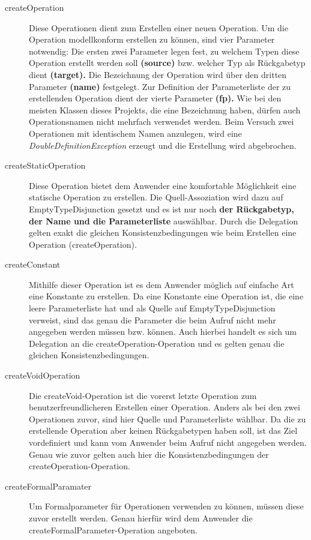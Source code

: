 \begin{description}
\item[createOperation]
Diese Operationen dient zum Erstellen einer neuen Operation. Um die Operation modellkonform erstellen zu können, sind vier Parameter notwendig:
Die ersten zwei Parameter legen fest, zu welchem Typen diese Operation erstellt werden soll \textbf{(source)} bzw. welcher Typ als Rückgabetyp dient \textbf{(target).}
Die Bezeichnung der Operation wird über den dritten Parameter \textbf{(name)} festgelegt. 
Zur Definition der Parameterliste der zu erstellenden Operation dient der vierte Parameter \textbf{(fp).}
Wie bei den meisten Klassen dieses Projekts, die eine Bezeichnung haben, dürfen auch Operationsnamen nicht mehrfach verwendet werden. Beim Versuch zwei Operationen mit identischem Namen anzulegen, wird eine \emph{DoubleDefinitionException} erzeugt und die Erstellung wird abgebrochen.
\item[createStaticOperation]
Diese Operation bietet dem Anwender eine komfortable Möglichkeit eine statische Operation zu erstellen. Die Quell-Assoziation wird dazu auf EmptyTypeDisjunction gesetzt und es ist nur noch \textbf{der Rückgabetyp, der Name und die Parameterliste} auswählbar. Durch die Delegation gelten exakt die gleichen Konsistenzbedingungen wie beim Erstellen eine Operation (createOperation).
\item[createConstant]
Mithilfe dieser Operation ist es dem Anwender möglich auf einfache Art eine Konstante zu erstellen. Da eine Konstante eine Operation ist, die eine leere Parameterliste hat und als Quelle auf EmptyTypeDisjunction verweist, sind das genau die Parameter die beim Aufruf nicht mehr angegeben werden müssen bzw. können. Auch hierbei handelt es sich um Delegation an die createOperation-Operation und es gelten genau die gleichen Konsistenzbedingungen.
\item[createVoidOperation]
Die createVoid-Operation ist die vorerst letzte Operation zum benutzerfreundlicheren Erstellen einer Operation. Anders als bei den zwei Operationen zuvor, sind hier Quelle und Parameterliste wählbar. Da die zu erstellende Operation aber keinen Rückgabetypen haben soll, ist das Ziel vordefiniert und kann vom Anwender beim Aufruf nicht angegeben werden. Genau wie zuvor gelten auch hier die Konsistenzbedingungen der createOperation-Operation.
\item[createFormalParamater]
Um Formalparameter für Operationen verwenden zu können, müssen diese zuvor erstellt werden. Genau hierfür wird dem Anwender die createFormalParameter-Operation angeboten.

\end{description}
